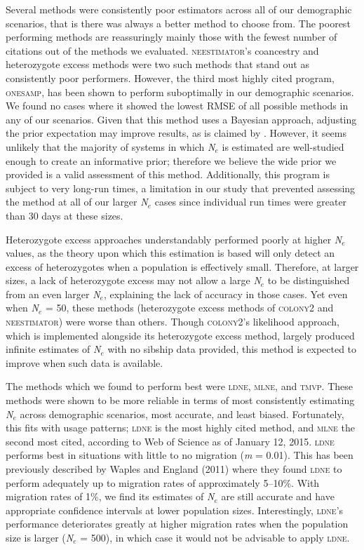 Several methods were consistently poor estimators across all of our demographic scenarios, that is 
there was always a better method to choose from. The poorest performing methods are reassuringly 
mainly those with the fewest number of citations out of the methods we evaluated. \textsc{neestimator}'s 
coancestry and heterozygote excess methods were two such methods that stand out as consistently poor 
performers. However, the third most highly cited program, \textsc{onesamp}, has been shown to perform 
suboptimally in our demographic scenarios. We found no cases where it showed the lowest RMSE of all 
possible methods in any of our scenarios. Given that this method uses a Bayesian approach, adjusting 
the prior expectation may improve results, as is claimed by \citet{Holleley:2013}. However, it seems 
unlikely that the majority of systems in which \emph{N}$_e$ is estimated are well-studied enough to 
create an informative prior; therefore we believe the wide prior we provided is a valid assessment of 
this method. Additionally, this program is subject to very long-run times, a limitation in our study 
that prevented assessing the method at all of our larger \emph{N}$_e$ cases since individual run 
times were greater than 30 days at these sizes.

Heterozygote excess approaches understandably performed poorly at higher \emph{N}$_e$ values, as 
the theory upon which this estimation is based will only detect an excess of heterozygotes when 
a population is effectively small. Therefore, at larger sizes, a lack of heterozygote excess may 
not allow a large \emph{N}$_e$ to be distinguished from an even larger \emph{N}$_e$, explaining 
the lack of accuracy in those cases. Yet even when \emph{N}$_e$ = 50, these methods (heterozygote 
excess methods of \textsc{colony2} and \textsc{neestimator}) were worse than others. Though 
\textsc{colony2}'s likelihood approach, which is implemented alongside its heterozygote excess method, 
largely produced infinite estimates of \emph{N}$_e$ with no sibship data provided, this method is 
expected to improve when such data is available.

The methods which we found to perform best were \textsc{ldne}, \textsc{mlne}, and \textsc{tmvp}. 
These methods were shown to be more reliable in terms of most consistently estimating \emph{N}$_e$ 
across demographic scenarios, most accurate, and least biased. Fortunately, this fits with usage 
patterns; \textsc{ldne} is the most highly cited method, and \textsc{mlne} the second most cited, 
according to Web of Science as of January 12, 2015. \textsc{ldne} performs best in situations with 
little to no migration (\emph{m} = 0.01). This has been previously described by Waples and England (2011) 
where they found \textsc{ldne} to perform adequately up to migration rates of approximately 5--10\%. 
With migration rates of 1\%, we find its estimates of \emph{N}$_e$ are still accurate and have 
appropriate confidence intervals at lower population sizes. Interestingly, \textsc{ldne}'s performance 
deteriorates greatly at higher migration rates when the population size is larger (\emph{N}$_e$ = 500), 
in which case it would not be advisable to apply \textsc{ldne}.

